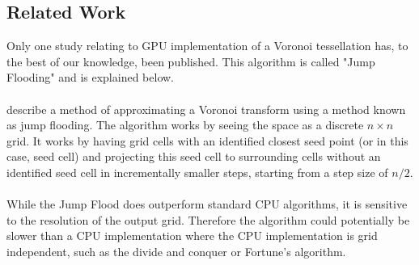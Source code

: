 \subsection{Related Work}\label{gpu:sec:rel}
Only one study relating to GPU implementation of a Voronoi tessellation has, to the best of our knowledge, been published. This algorithm is called "Jump Flooding" and is explained below.
\\
\\
\citet{rong2006jump} describe a method of approximating a Voronoi transform using a method known as jump flooding. The algorithm works by seeing the space as a discrete $n \times n$ grid. It works by having grid cells with an identified closest seed point (or in this case, seed cell) and projecting this seed cell to surrounding cells without an identified seed cell in incrementally smaller steps, starting from a step size of $n/2$.
\\
\\
While the Jump Flood does outperform standard CPU algorithms, it is sensitive to the resolution of the output grid. Therefore the algorithm could potentially be slower than a CPU implementation where the CPU implementation is grid independent, such as the divide and conquer or Fortune's algorithm.
